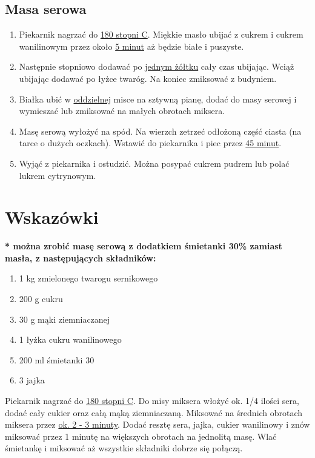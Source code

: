 \documentclass[12pt, a4paper, titlepage]{article}
\begin{document}
\subsection{Masa serowa}
\begin{enumerate}[-]
\item Piekarnik nagrzać do \underline{180 stopni C}. Miękkie masło ubijać z cukrem i cukrem wanilinowym przez około \underline{5 minut} aż będzie białe i puszyste.

\item Następnie stopniowo dodawać po \underline{jednym żółtku} cały czas ubijając. Wciąż ubijając dodawać po łyżce twaróg. Na koniec zmiksować z budyniem.

\item Białka ubić w \underline{oddzielnej} misce na sztywną pianę, dodać do masy serowej i wymieszać lub zmiksować na małych obrotach miksera.

\item Masę serową wyłożyć na spód. Na wierzch zetrzeć odłożoną część ciasta (na tarce o dużych oczkach). Wstawić do piekarnika i piec przez \underline{45 minut}.

\item Wyjąć z piekarnika i ostudzić. Można posypać cukrem pudrem lub polać lukrem cytrynowym.
\end{enumerate}
\section{Wskazówki}

\textbf{* można zrobić masę serową z dodatkiem śmietanki 30\% zamiast masła, z następujących składników:}
\begin{enumerate}[-]
\item 1 kg zmielonego twarogu sernikowego
\item 200 g cukru
\item 30 g mąki ziemniaczanej
\item 1 łyżka cukru wanilinowego
\item 200 ml śmietanki 30%
\item 3 jajka
\end{enumerate}
Piekarnik nagrzać do \underline{180 stopni C}. Do misy miksera włożyć ok. 1/4 ilości sera, dodać cały cukier oraz całą mąką ziemniaczaną. Miksować na średnich obrotach miksera przez \underline{ok. 2 - 3 minuty}. Dodać resztę sera, jajka, cukier wanilinowy i znów miksować przez 1 minutę na większych obrotach na jednolitą masę. Wlać śmietankę i miksować aż wszystkie składniki dobrze się połączą.
\end{document}
